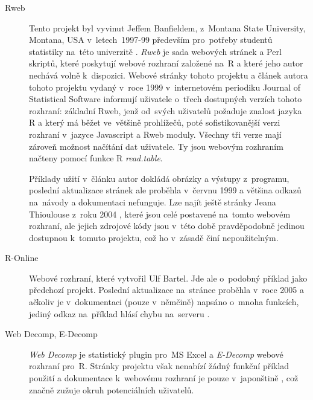 \documentclass[thesis=B,czech]{FITthesis}[2012/06/26]
\begin{document}
\begin{description}
\item[Rweb] \begin{sloppypar} Tento projekt byl vyvinut Jeffem Banfieldem, z~Montana State University, Montana, USA v~letech~1997-99 především pro~potřeby studentů statistiky na~této univerzitě \cite{Rweb}. \textit{Rweb} je sada webových stránek a Perl skriptů, které poskytují webové rozhraní založené na~R a které jeho autor nechává volně k~dispozici. Webové stránky tohoto projektu \cite{Rweb} a článek autora tohoto projektu vydaný v~roce 1999 v~internetovém periodiku Journal of Statistical Software \cite{RwebArticle} informují uživatele o~třech dostupných verzích tohoto rozhraní: základní Rweb, jenž od~svých uživatelů požaduje znalost jazyka R a který má běžet ve~většině prohlížečů, poté sofistikovanější verzi rozhraní v~jazyce Javascript a Rweb moduly. Všechny tři verze mají zároveň možnost načítání dat uživatele. Ty jsou webovým rozhraním načteny pomocí funkce R \textit{read.table}.\end{sloppypar}

Příklady užití v~článku autor dokládá obrázky a výstupy z~programu, poslední aktualizace stránek ale proběhla v~červnu 1999 a většina odkazů na~návody a dokumentaci nefunguje. Lze najít ještě stránky Jeana Thioulouse z~roku 2004 \cite{RwebJean}, které jsou celé postavené na~tomto webovém rozhraní, ale jejich zdrojové kódy jsou v~této době pravděpodobně jedinou dostupnou  k~tomuto projektu, což ho v~zásadě činí nepoužitelným.

\item[R-Online] \begin{sloppypar} Webové rozhraní, které vytvořil Ulf Bartel. Jde ale o~podobný příklad jako předchozí projekt. Poslední aktualizace na~stránce proběhla v~roce 2005 a ačkoliv je v~dokumentaci (pouze v~němčině) napsáno o~mnoha funkcích, jediný odkaz na~příklad hlásí chybu na~serveru \cite{Ronline}.\end{sloppypar}

\item[Web Decomp, E-Decomp] \begin{sloppypar} \textit{Web Decomp} je statistický plugin pro~MS Excel a \textit{E-Decomp} webové rozhraní pro~R. Stránky projektu však nenabízí žádný funkční příklad použití a dokumentace k~webovému rozhraní je pouze v~japonštině \cite{WebDecomp}, což značně zužuje okruh potenciálních uživatelů.\end{sloppypar}


\end{description}
\end{document}
